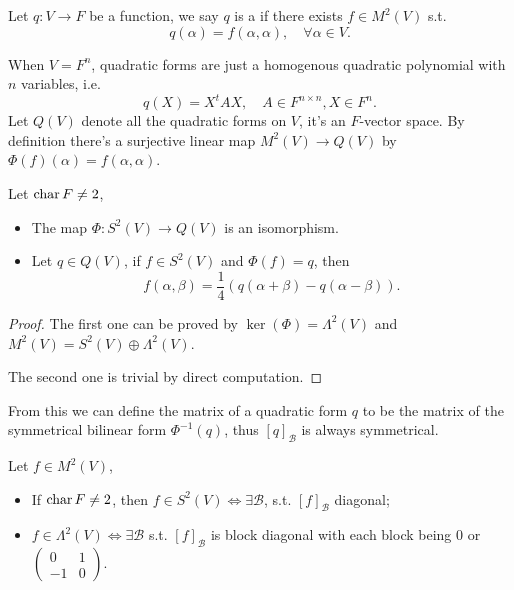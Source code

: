 \begin{definition}
	Let $q: V\to F$ be a function, we say $q$ is a 
	if there exists $f\in M^2(V)$ s.t.
	\[
	q(\alpha) = f(\alpha, \alpha), \quad \forall \alpha\in V.
	\]
\end{definition}

When $V = F^n$, quadratic forms are just a homogenous quadratic polynomial
with $n$ variables, i.e.
\[
q(X) = X^t A X, \quad A\in F^{n\times n}, X \in F^{n}.
\]
Let $Q(V)$ denote all the quadratic forms on $V$, it's an $F$-vector space.
By definition there's a surjective linear map $M^2(V)\to Q(V)$ by
$\Phi(f)(\alpha) = f(\alpha, \alpha)$.

\begin{proposition}
	Let $\operatorname{char} F \ne 2$,
	\begin{itemize}
		\item The map $\Phi: S^2(V) \to Q(V)$ is an isomorphism.
		\item Let $q\in Q(V)$, if $f\in S^2(V)$ and $\Phi(f) = q$, then
			\[
			f(\alpha, \beta) = \frac{1}{4}(q(\alpha+\beta) - q(\alpha-\beta)).
			\]
	\end{itemize}
\end{proposition}
\begin{proof}[Proof]
    The first one can be proved by $\ker(\Phi) = \Lambda^2(V)$ and
	$M^2(V) = S^2(V) \oplus \Lambda^2(V)$.

	The second one is trivial by direct computation.
\end{proof}

From this we can define the matrix of a quadratic form $q$ to be
the matrix of the symmetrical bilinear form $\Phi^{-1}(q)$,
thus $[q]_{\mathcal{B}}$ is always symmetrical.

\begin{theorem}
    Let $f\in M^2(V)$,
	\begin{itemize}
		\item  If $\operatorname{char} F\ne 2$, then $f\in S^2(V) \iff \exists \mathcal{B}$,
			s.t. $[f]_ {\mathcal{B}}$ diagonal;
		\item $f\in\Lambda^2(V) \iff \exists \mathcal{B}$ s.t. $[f]_{\mathcal{B}}$
			is block diagonal with each block being $0$ or $\begin{pmatrix}
				0&1\\-1&0
			\end{pmatrix}$.
	\end{itemize}
\end{theorem}

